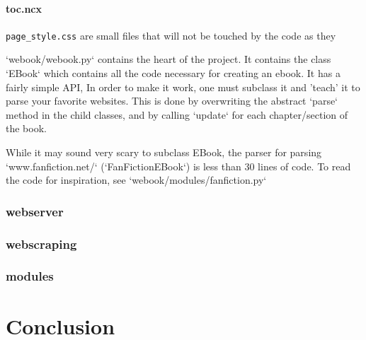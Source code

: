 \documentclass[]{report}   %
\begin{document}
\subsubsection{toc.ncx}


\texttt{page\_style.css} are small files that will not be touched by the code as they 





`webook/webook.py` contains the heart of the project. It contains the class `EBook`
which contains all the code necessary for creating an ebook. It has a fairly
simple API, In order to make it work, one must subclass it and 'teach' it to
parse your favorite websites. This is done by overwriting the abstract `parse` method in
the child classes, and by calling `update` for each chapter/section of the
book.

While it may sound very scary to subclass EBook, the parser for parsing
`www.fanfiction.net/` (`FanFictionEBook`) is less than 30 lines of code. To
read the code for inspiration, see `webook/modules/fanfiction.py`


\subsection{webserver}
\subsection{webscraping}
\subsection{modules}

\chapter{Conclusion}


\begin{thebibliography}{9}
\end{thebibliography}
\end{document}
